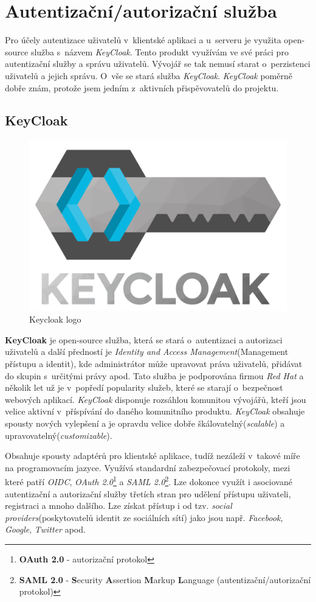 \newpage
\section{Autentizační/autorizační služba}
\label{pouzite:auth}
Pro účely autentizace uživatelů v~klientské aplikaci a u~serveru je využita open-source služba s~názvem \emph{KeyCloak}.
Tento produkt využívám ve své práci pro autentizační služby a správu uživatelů.
Vývojář se tak nemusí starat o~perzistenci uživatelů a jejich správu.
O~vše se stará služba \emph{KeyCloak}.
\emph{KeyCloak} poměrně dobře znám, protože jsem jedním z~aktivních přispěvovatelů do projektu.

\subsection*{KeyCloak}
\label{terminy:keycloak}

\begin{figure}[hbt]
  \centering
  \includegraphics[width=.25 \linewidth]{obrazky-figures/keycloak2.png}
  \caption{Keycloak logo}
\end{figure}

\textbf{KeyCloak} je open-source služba, která se stará o~autentizaci a autorizaci uživatelů a další předností je \emph{Identity and Access Management}(Management přístupu a identit),
kde administrátor může upravovat práva uživatelů, přidávat do skupin s~určitými právy apod.
Tato služba je podporována firmou \emph{Red Hat} a několik let už je v~popředí popularity služeb, které se starají o~bezpečnost webových aplikací. \emph{KeyCloak} disponuje rozsáhlou komunitou vývojářů, kteří jsou velice aktivní v~příspívání do daného komunitního produktu.
\emph{KeyCloak} obsahuje spousty nových vylepšení a je opravdu velice dobře škálovatelný(\emph{scalable}) a upravovatelný(\emph{customizable}).

Obsahuje spousty adaptérů pro klientské aplikace, tudíž nezáleží v~takové míře na programovacím jazyce.
Využívá standardní zabezpečovací protokoly, mezi které patří \emph{OIDC}, \emph{OAuth 2.0}\footnote{\textbf{OAuth 2.0} - autorizační protokol} a \emph{SAML 2.0}\footnote{\textbf{SAML 2.0} - \textbf{S}ecurity \textbf{A}ssertion \textbf{M}arkup \textbf{L}anguage (autentizační/autorizační protokol)}.
Lze dokonce využít i asociované autentizační a autorizační služby třetích stran pro udělení přístupu uživateli, registraci a mnoho dalšího.
Lze získat přístup i od tzv. \emph{social providers}(poskytovatelů identit ze sociálních sítí) jako jsou např. \emph{Facebook}, \emph{Google}, \emph{Twitter} apod.

